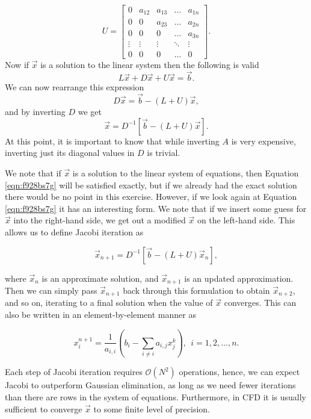 \begin{equation}
	U = 
	\begin{bmatrix}
	    0 & a_{12} & a_{13} & \dots  & a_{1n} \\
	    0 & 0 & a_{23} & \dots  & a_{2n} \\
			0 & 0 & 0 & \dots  & a_{3n} \\
	    \vdots & \vdots & \vdots & \ddots & \vdots \\
	    0 & 0 & 0 & \dots  & 0
	\end{bmatrix}.
\end{equation}
Now if $\vec{x}$ is a solution to the linear system then the following is valid
\begin{equation}
	L\vec{x} + D\vec{x} + U\vec{x} = \vec{b}.
\end{equation}
We can now rearrange this expression
\begin{equation}
	D\vec{x} = \vec{b} - (L+U)\vec{x},
\end{equation}
and by inverting $D$ we get
\begin{equation}
	\vec{x} = D^{-1}\left[ \vec{b} - (L+U)\vec{x} \right].
	\label{eqn:f928bs7g}
\end{equation}
At this point, it is important to know that while inverting $A$ is very expensive, inverting just its diagonal values in $D$ is trivial.

We note that if $\vec{x}$ is a solution to the linear system of equations, then Equation \ref{eqn:f928bs7g} will be satisfied exactly, but if we already had the exact solution there would be no point in this exercise. However, if we look again at Equation \ref{eqn:f928bs7g} it has an interesting form. We note that if we insert some guess for $\vec{x}$ into the right-hand side, we get out a modified $\vec{x}$ on the left-hand side. This allows us to define Jacobi iteration as
\begin{eqBox}
\begin{equation}
	\vec{x}_{n+1} = D^{-1}\left[ \vec{b} - (L+U)\vec{x}_n \right],
	\label{eqn:3jc810fg}
\end{equation}
\end{eqBox}
where $\vec{x}_n$ is an approximate solution, and $\vec{x}_{n+1}$ is an updated approximation. Then we can simply pass $\vec{x}_{n+1}$ back through this formulation to obtain $\vec{x}_{n+2}$, and so on, iterating to a final solution when the value of $\vec{x}$ converges. This can also be written in an element-by-element manner as
\begin{eqBox}
\begin{equation}
	x_i^{n+1} = \frac{1}{a_{i,i}}\left(b_i - \sum_{i \neq i} a_{i,j}x_j^k \right), \: \: i = 1,2,\hdots,n.
\end{equation}
\end{eqBox}
Each step of Jacobi iteration requires $\mathcal{O}(N^2)$ operations, hence, we can expect Jacobi to outperform Gaussian elimination, as long as we need fewer iterations than there are rows in the system of equations. Furthermore, in CFD it is usually sufficient to converge $\vec{x}$ to some finite level of precision.

